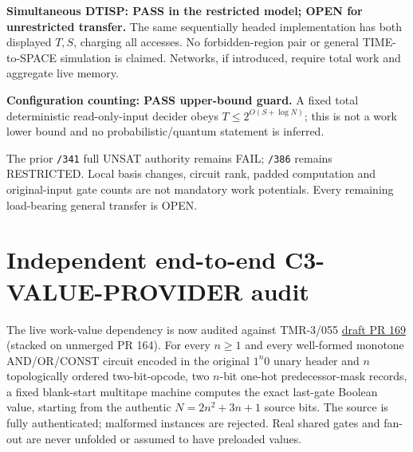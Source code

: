 \documentclass[11pt]{article}
\begin{document}
\noindent\textbf{Simultaneous DTISP: PASS in the restricted model;
OPEN for unrestricted transfer.} The same sequentially headed
implementation has both displayed \(T,S\), charging all accesses.
No forbidden-region pair or general TIME-to-SPACE simulation is
claimed. Networks, if introduced, require total work and aggregate
live memory.

\noindent\textbf{Configuration counting: PASS upper-bound guard.}
A fixed total deterministic read-only-input decider obeys
\(T\le 2^{O(S+\log N)}\); this is not a work lower bound and no
probabilistic/quantum statement is inferred.

The prior \texttt{/341} full UNSAT authority remains FAIL;
\texttt{/386} remains RESTRICTED. Local basis changes, circuit rank,
padded computation and original-input gate counts are not mandatory
work potentials. Every remaining load-bearing general transfer is OPEN.

\section{Independent end-to-end C3-VALUE-PROVIDER audit}
The live work-value dependency is now audited against TMR-3/055
\href{https://github.com/j15marti/pnp/pull/169}{draft PR 169}
(stacked on unmerged PR 164). For every $n\ge1$ and every
well-formed monotone AND/OR/CONST circuit encoded in the original
$1^n0$ unary header and $n$ topologically ordered
two-bit-opcode, two $n$-bit one-hot predecessor-mask records,
a fixed blank-start multitape machine computes the exact
last-gate Boolean value, starting from the authentic
$N=2n^2+3n+1$ source bits. The source is fully authenticated;
malformed instances are rejected. Real shared gates and fan-out
are never unfolded or assumed to have preloaded values.
\end{document}
